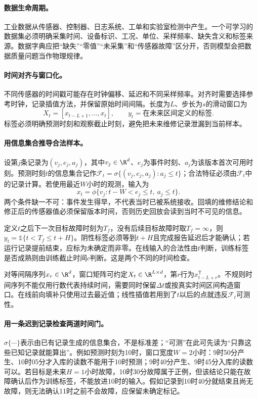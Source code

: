 \paragraph{数据生命周期。}
工业数据从传感器、控制器、日志系统、工单和实验室检测中产生。一个可学习的数据集必须明确采集时间、设备标识、工况、单位、采样频率、缺失含义和标签来源。数据字典应把“缺失”“零值”“未采集”和“传感器故障”区分开，否则模型会把数据质量问题当作物理规律。

\paragraph{时间对齐与窗口化。}
不同传感器的时间戳可能存在时钟偏移、延迟和不同采样频率。对齐时需要选择参考时钟，记录插值方法，并保留原始时间间隔。长度为$L$、步长为$s$的滑动窗口为
\begin{equation}
 X_t=[x_{t-L+1},\ldots,x_t],
 \qquad y_t=\text{在未来区间定义的标签}.
\end{equation}
标签必须明确预测时刻和观察截止时刻，避免把未来维修记录泄漏到当前样本。

\paragraph{用信息集合推导合法样本。}
设第$j$条记录为$(v_j,e_j,a_j)$，其中$v_j\in\R^d$、$e_j$为事件时刻、$a_j$为该版本首次可用时刻。预测时刻$t$的信息集合记作$\mathcal F_t=\sigma\{(v_j,e_j,a_j):a_j\leq t\}$；合法特征必须由$\mathcal F_t$中的记录计算。若使用最近$W$小时的观测，输入为
\begin{equation}
 x_t=\phi\{v_j:t-W<e_j\leq t,\ a_j\leq t\}.
\end{equation}
两个条件缺一不可：事件发生得早，不代表当时已被系统接收。回填的维修结论和修正后的传感器值必须保留版本时间，否则历史回放会读到当时不可见的信息。

定义$t$之后下一次目标故障时刻为$T_f$，没有后续目标故障时取$T_f=\infty$，则$y_t=\mathbb 1\{t<T_f\leq t+H\}$。阴性标签必须等到$t+H$且完成报告延迟后才能确认；若运行记录提前结束，应标为未确定而非零。在线输入的合法性由$t$判断，训练标签是否成熟则由训练截止时间$c$判断。这是两个不同的时间检查。

对等间隔序列$x_r\in\R^d$，窗口矩阵可约定$X_t\in\R^{L\times d}$，第$r$行为$x_{t-L+r}^{\mathsf T}$。不规则时间序列不能仅用行数代表持续时间，需要同时保留$\Delta t$或按真实时间区间构造窗口。在线前向填补只使用过去最近值；线性插值若用到了$t$以后的点就违反$\mathcal F_t$可测性。

\paragraph{用一条迟到记录检查两道时间门。}
$\sigma\{\cdots\}$表示由已有记录生成的信息集合，不是标准差；“可测”在此可先读为“只靠这些已知记录就能算出”。例如预测时刻为10时，窗口宽度$W=2$小时：9时50分产生、10时05分才入库的读数不能用于10时预测；9时40分产生、9时45分入库的读数可以。若目标是未来$H=1$小时故障，10时30分故障属于正例，但该结论只能在故障确认后作为训练标签，不能放进10时的输入。假如记录到10时40分就结束且尚无故障，则无法确认11时之前不会故障，应保留未确定标记。

